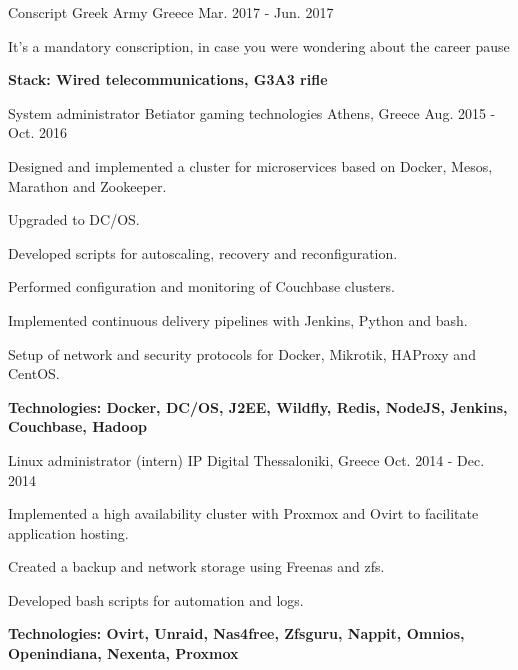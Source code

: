 \begin{cventries}
\cventry
{Conscript} %
{Greek Army} %
{Greece} %
{Mar. 2017 - Jun. 2017} %
{ %
\begin{cvitems}
\item {It's a mandatory conscription, in case you were wondering about the career pause}
\item {\bfseries{Stack:} Wired telecommunications, G3A3 rifle}
\end{cvitems}
}


\cventry
{System administrator} %
{Betiator gaming technologies} %
{Athens, Greece} %
{Aug. 2015 - Oct. 2016} %
{ %
\begin{cvitems}
\item {Designed and implemented a cluster for microservices based on Docker, Mesos, Marathon and Zookeeper.}
\item {Upgraded to DC/OS.}
\item {Developed scripts for autoscaling, recovery and reconfiguration.}
\item {Performed configuration and monitoring of Couchbase clusters.}
\item {Implemented continuous delivery pipelines with Jenkins, Python and bash.}
\item {Setup of network and security protocols for Docker, Mikrotik, HAProxy and CentOS.}
\item {\bfseries{Technologies:} Docker, DC/OS, J2EE, Wildfly, Redis, NodeJS, Jenkins, Couchbase, Hadoop}
\end{cvitems}
}


\cventry
{Linux administrator (intern)} %
{IP Digital} %
{Thessaloniki, Greece} %
{Oct. 2014 - Dec. 2014} %
{ %
\begin{cvitems}
\item {Implemented a high availability cluster with Proxmox and Ovirt to facilitate application hosting.}
\item {Created a backup and network storage using Freenas and zfs.}
\item {Developed bash scripts for automation and logs.}
\item {\bfseries{Technologies:} Ovirt, Unraid, Nas4free, Zfsguru, Nappit, Omnios, Openindiana, Nexenta, Proxmox}
\end{cvitems}
}


\end{cventries}
